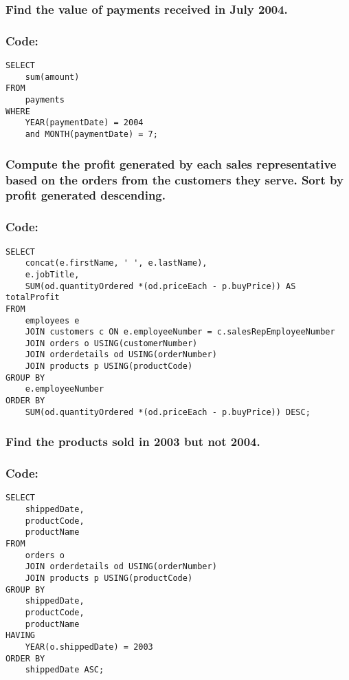 \documentclass[12pt]{article}
\begin{document}
\vspace{10mm}

\subsubsection{Find the value of  payments received in July 2004.}
\subsubsection*{Code: }
\begin{verbatim}
SELECT
    sum(amount)
FROM
    payments
WHERE
    YEAR(paymentDate) = 2004
    and MONTH(paymentDate) = 7;
\end{verbatim}
\vspace{10mm}

\subsubsection{Compute the profit generated by each sales representative based on the orders from the customers they serve. Sort by profit generated descending.}
\subsubsection*{Code: }
\begin{verbatim}
SELECT
    concat(e.firstName, ' ', e.lastName),
    e.jobTitle,
    SUM(od.quantityOrdered *(od.priceEach - p.buyPrice)) AS totalProfit
FROM
    employees e
    JOIN customers c ON e.employeeNumber = c.salesRepEmployeeNumber
    JOIN orders o USING(customerNumber)
    JOIN orderdetails od USING(orderNumber)
    JOIN products p USING(productCode)
GROUP BY
    e.employeeNumber
ORDER BY
    SUM(od.quantityOrdered *(od.priceEach - p.buyPrice)) DESC;
\end{verbatim}
\vspace{10mm}

\subsubsection{Find the products sold in 2003 but not 2004.}
\subsubsection*{Code:}
\begin{verbatim}
SELECT
    shippedDate,
    productCode,
    productName
FROM
    orders o
    JOIN orderdetails od USING(orderNumber)
    JOIN products p USING(productCode)
GROUP BY
    shippedDate,
    productCode,
    productName
HAVING
    YEAR(o.shippedDate) = 2003
ORDER BY
    shippedDate ASC;
\end{verbatim}
\end{document}
